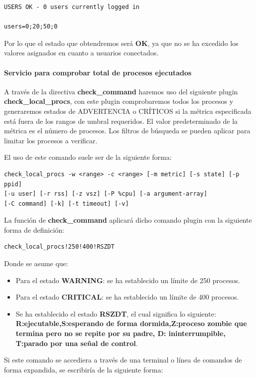 \begin{lstlisting}
USERS OK - 0 users currently logged in

users=0;20;50;0
\end{lstlisting}

Por lo que el estado que obtendremos será \textbf{OK}, ya que no se ha excedido los valores asignados en cuanto a usuarios conectados.
\paragraph{Servicio para comprobar total de procesos ejecutados}

A través de la directiva \textbf{check\_command} haremos uso del siguiente plugin \textbf{check\_local\_procs}, con este plugin comprobaremos todos los procesos y generaremos estados de ADVERTENCIA o CRÍTICOS si la métrica especificada está fuera de los rangos de umbral requeridos. El valor predeterminado de la métrica es el número de procesos. Los filtros de búsqueda se pueden aplicar para limitar los procesos a verificar.

El uso de este comando suele ser de la siguiente forma:
\begin{lstlisting}
check_local_procs -w <range> -c <range> [-m metric] [-s state] [-p ppid]
[-u user] [-r rss] [-z vsz] [-P %cpu] [-a argument-array]
[-C command] [-k] [-t timeout] [-v]
\end{lstlisting}

La función de \textbf{check\_command} aplicará dicho comando plugin con la siguiente forma de definición:
\begin{lstlisting}
check_local_procs!250!400!RSZDT
\end{lstlisting} 

Donde se asume que:
\begin{itemize}
	\item Para el estado \textbf{WARNING}: se ha establecido un límite de 250 procesos.
	\item Para el estado \textbf{CRITICAL}: se ha establecido un límite de 400 procesos.
	\item Se ha establecido el estado \textbf{RSZDT}, el cual significa lo siguiente: \textbf{R:ejecutable,S:esperando de forma dormida,Z:proceso zombie que termina pero no se repite por su padre, D: ininterrumpible, T:parado por una señal de control}.
\end{itemize}
\newpage
Si este comando se accediera a través de una terminal o línea de comandos de forma expandida, se escribiría de la siguiente forma:

